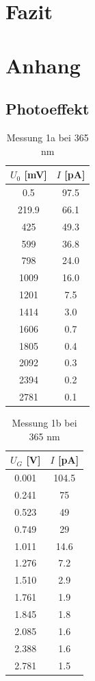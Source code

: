 \documentclass{article}
\begin{document}
\clearpage
\section{Fazit}


\clearpage
\section{Anhang}
\subsection{Photoeffekt}

\begin{table}[h!]
  \centering
  \begin{tabular}{|c|c|}
      \hline
      $U_0$ [mV] & $I$ [pA] \\
      \hline
      0.5   & 97.5 \\
      219.9 & 66.1 \\
      425   & 49.3 \\
      599   & 36.8 \\
      798   & 24.0 \\
      1009  & 16.0 \\
      1201  & 7.5  \\
      1414  & 3.0  \\
      1606  & 0.7  \\
      1805  & 0.4  \\
      2092  & 0.3  \\
      2394  & 0.2  \\
      2781  & 0.1  \\
      \hline
  \end{tabular}
  \caption{Messung 1a bei 365 nm}
  \label{tab:messung1a}
\end{table}

\begin{table}[h!]
  \centering
  \begin{tabular}{|c|c|}
      \hline
      $U_G$ [V] & $I$ [pA] \\
      \hline
      0.001  & 104.5 \\
      0.241  & 75    \\
      0.523  & 49    \\
      0.749  & 29    \\
      1.011  & 14.6  \\
      1.276  & 7.2   \\
      1.510  & 2.9   \\
      1.761  & 1.9   \\
      1.845  & 1.8   \\
      2.085  & 1.6   \\
      2.388  & 1.6   \\
      2.781  & 1.5   \\
      \hline
  \end{tabular}
  \caption{Messung 1b bei 365 nm}
  \label{tab:messung1b}
\end{table}
\end{document}
